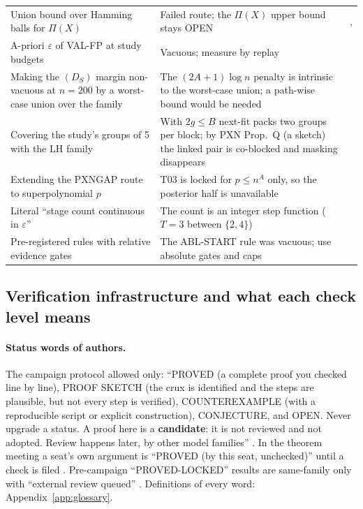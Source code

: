 {\begin{xltabular}{\textwidth}{@{}>{\raggedright\arraybackslash}p{4.2cm}>{\raggedright\arraybackslash}X >{\raggedright\arraybackslash}p{3.3cm}@{}}
Union bound over Hamming balls for $\Pi(X)$ & Failed route; the $\Pi(X)$ upper bound stays OPEN & ,   \\
A-priori $\varepsilon$ of VAL-FP at study budgets & Vacuous; measure by replay &   \\
Making the $(D_S)$ margin non-vacuous at $n=200$ by a worst-case union over the family & The $(2A+1)\log n$ penalty is intrinsic to the worst-case union; a path-wise bound would be needed &  \\
Covering the study's groups of 5 with the LH family & With $2g\le B$ next-fit packs two groups per block; by PXN Prop.~Q (a sketch) the linked pair is co-blocked and masking disappears &  \\
Extending the PXNGAP route to superpolynomial $p$ & T03 is locked for $p\le n^A$ only, so the posterior half is unavailable &  \\
Literal ``stage count continuous in $\varepsilon$'' & The count is an integer step function ($T=3$ between $\{2,4\}$) &   \\
Pre-registered rules with relative evidence gates & The ABL-START rule was vacuous; use absolute gates and caps &   \\
\bottomrule
\end{xltabular}
}

\subsection{Verification infrastructure and what each check level means}\label{sec:history:verif}

\paragraph{Status words of authors.} The campaign protocol allowed only: ``PROVED (a complete proof you checked line by line), PROOF SKETCH (the crux is identified and the steps are plausible, but not every step is verified), COUNTEREXAMPLE (with a reproducible script or explicit construction), CONJECTURE, and OPEN. Never upgrade a status. A proof here is a \textbf{candidate}: it is not reviewed and not adopted. Review happens later, by other model families'' . In the theorem meeting a seat's own argument is ``PROVED (by this seat, unchecked)'' until a check is filed . Pre-campaign ``PROVED-LOCKED'' results are same-family only with ``external review queued'' . Definitions of every word: Appendix~\ref{app:glossary}.

